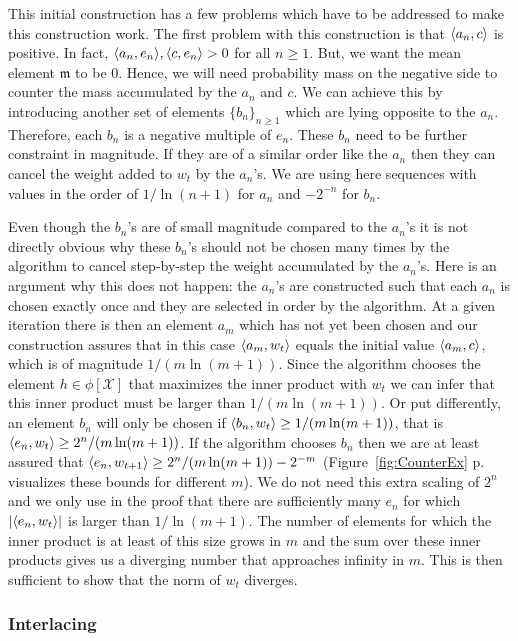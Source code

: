 \documentclass[AHL,Unicode,longabstracts,published]{cedram}
\theoremstyle{remark}
\newcommand{\X}{\mathcal{X}}
\newcommand{\mean}{\mathfrak{m}}
\providecommand{\abs}[1]{\left\lvert#1\right\rvert}
\providecommand{\inner}[2]{\left\langle #1,#2\right\rangle}
\let\originalleft\left
\let\originalright\right
\renewcommand{\left}{\mathopen{}\mathclose\bgroup\originalleft}
\renewcommand{\right}{\aftergroup\egroup\originalright}
\newcounter{setofstep}
\newcounter{step}[setofstep]
\begin{document}
This initial construction has a few problems which have to be addressed to make this construction work. The first problem with this construction is that $\inner{a_n}{c}$ is positive. In fact, $\inner{a_n}{e_n}, \inner{c}{e_n} > 0$ for all $n\geq 1$. But, we want the mean element $\mean$ to be $0$. Hence, we will need probability mass on the negative side to counter the mass accumulated by the $a_n$ and $c$. We can achieve this by introducing another set of elements $\{b_n\}_{n\geq 1}$ which are lying opposite to the $a_n$. Therefore, each $b_n$ is a negative multiple of $e_n$. These $b_n$ need to be further constraint in magnitude. If they are of a similar order like the $a_n$ then they can cancel the weight added to $w_t$ by the $a_n$'s. We are using here sequences with values in the order of $1/\ln(n+1)$ for $a_n$ and $-2^{-n}$ for $b_n$.

Even though the $b_n$'s are of small magnitude compared to the $a_n$'s it is not directly obvious why these $b_n$'s should not be chosen many times by the algorithm to cancel step-by-step the weight accumulated by the $a_n$'s. Here is an argument why this does not happen: the $a_n$'s are constructed such that each $a_n$ is chosen exactly once and they are selected in order by the algorithm. At a given iteration there is then an element $a_m$ which has not yet been chosen and our construction assures that in this case $\inner{a_m}{w_t}$ equals the initial value $\inner{a_m}{c}$, which is of magnitude $1/(m\ln(m+1))$. Since the algorithm chooses the element $h \in \phi[\X]$ that maximizes the inner product with $w_t$ we can infer that this inner product must be larger than $1/(m\ln(m+1))$. Or put differently, an element $b_n$ will only be chosen if $\inner{b_n}{w_t} \geq 1/(m\ln(m+1))$, that is $\inner{e_n}{w_t} \geq 2^{n}/(m\ln(m+1))$. If the algorithm chooses $b_n$ then we are at least assured that $\inner{e_n}{w_{t+1}} \geq 2^{n}/(m\ln(m+1)) - 2^{-m}$ (Figure~\ref{fig:CounterEx} p.~\pageref{fig:CounterEx} visualizes these bounds for different $m$). We do not need this extra scaling of $2^n$ and we only use in the proof that there are sufficiently many $e_n$ for which $\abs{\inner{e_n}{w_t}}$ is larger than $1/\ln(m+1)$. The number of elements for which the inner product is at least of this size grows in $m$ and the sum over these inner products gives us a diverging number that approaches infinity in $m$. This is then sufficient to show that the norm of $w_t$ diverges.

\subsubsection*{Interlacing}
\end{document}
